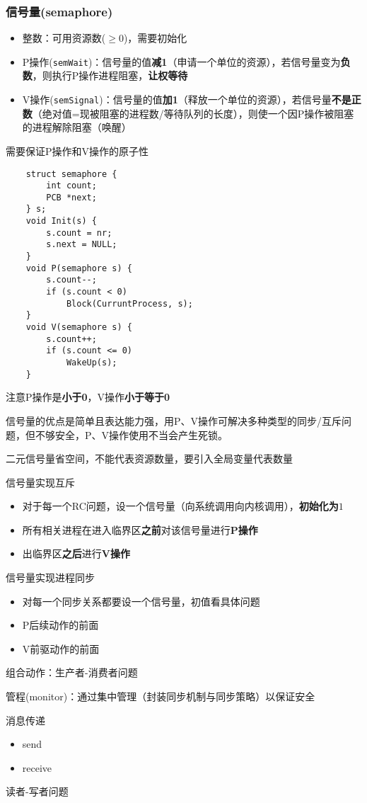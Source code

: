 \subsubsection{信号量(semaphore)}
\begin{itemize}
    \item 整数：可用资源数($\geq 0$)，需要初始化
    \item P操作(\verb'semWait')：信号量的值\textbf{减1}（申请一个单位的资源），若信号量变为\textbf{负数}，则执行P操作进程阻塞，\textbf{让权等待}
    \item V操作(\verb'semSignal')：信号量的值\textbf{加1}（释放一个单位的资源），若信号量\textbf{不是正数}（绝对值=现被阻塞的进程数/等待队列的长度），则使一个因P操作被阻塞的进程解除阻塞（唤醒）
\end{itemize}
需要保证P操作和V操作的原子性
\begin{lstlisting}
    struct semaphore {
        int count;
        PCB *next;
    } s;
    void Init(s) {
        s.count = nr;
        s.next = NULL;
    }
    void P(semaphore s) {
        s.count--;
        if (s.count < 0)
            Block(CurruntProcess, s);
    }
    void V(semaphore s) {
        s.count++;
        if (s.count <= 0)
            WakeUp(s);
    }
\end{lstlisting}
注意P操作是\textbf{小于0}，V操作\textbf{小于等于0}

信号量的优点是简单且表达能力强，用P、V操作可解决多种类型的同步/互斥问题，但不够安全，P、V操作使用不当会产生死锁。

二元信号量省空间，不能代表资源数量，要引入全局变量代表数量

信号量实现互斥
\begin{itemize}
    \item 对于每一个RC问题，设一个信号量（向系统调用向内核调用），\textbf{初始化为$1$}
    \item 所有相关进程在进入临界区\textbf{之前}对该信号量进行\textbf{P操作}
    \item 出临界区\textbf{之后}进行\textbf{V操作}
\end{itemize}

信号量实现进程同步
\begin{itemize}
    \item 对每一个同步关系都要设一个信号量，初值看具体问题
    \item P后续动作的前面
    \item V前驱动作的前面
\end{itemize}

组合动作：生产者-消费者问题


管程(monitor)：通过集中管理（封装同步机制与同步策略）以保证安全

消息传递
\begin{itemize}
    \item send
    \item receive
\end{itemize}

读者-写者问题